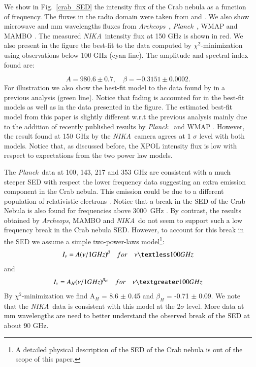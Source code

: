 \documentclass[twocolumn,traditabstract]{aa}
\def\NIKA{\textit{NIKA}}
\def\Archeops{\textit{Archeops}}
\def\Planck{\textit{Planck}}
\begin{document}
We show in Fig.~\ref{crab_SED} the intensity flux of the Crab nebula as a function of frequency. The fluxes in the radio domain were taken from \cite{dmitrenko1970absolute} and \cite{1971IzVUZ..14..157V}. We also show microwave and mm wavelengths fluxes from \Archeops\ \citep{macias2007archeops}, \Planck\ \citep{2015arXiv150702058P}, WMAP \citep{2011ApJS..192...19W} and MAMBO \citep{2002A&A...386.1044B}. The measured \NIKA\ intensity flux at 150 GHz is shown in red.
We also present in the figure the best-fit to the data computed by $\chi^2$-minimization using observations below 100 GHz (cyan line). The amplitude and spectral index found are: 

\begin{equation}
 A = 980.6 \pm 0.7  ,\quad \beta = -0.3151 \pm 0.0002. 
 \end{equation}
 For illustration we also show the best-fit model to the data found by \cite{macias2010} in a previous analysis (green line). 
Notice that fading is accounted for in the best-fit models as well as in the data presented in the figure.
The estimated best-fit model from this paper is slightly different w.r.t the previous analysis mainly due to the addition of recently published results by \Planck\ \citep{2015arXiv150702058P} and  WMAP \citep{2011ApJS..192...19W}. However, the result found at 150 GHz by the \NIKA\ camera agrees at 1 $\sigma$ level with both models. 
Notice that, as discussed before, the XPOL intensity flux is low with respect to expectations from the two power law models. 
 
The \Planck\ data at 100, 143, 217 and 353 GHz are consistent with a much
steeper SED with respect the lower frequency data suggesting an extra emission
component in the Crab nebula. This emission could be due to a different
population of relativistic electrons \citep{1965ARA&A...3..297G}. Notice that a
break in the SED of the Crab Nebula is also found for frequencies above 3000~GHz
\citep{macias2010}.  By contrast, the results obtained by {\it Archeops}, MAMBO
and \NIKA\ do not seem to support such a low frequency break in the Crab nebula
SED. However, to account for this break in the SED we assume a simple
two-power-laws model\footnote{A detailed physical description of the SED of the
  Crab nebula is out of the scope of this paper.}:
\begin{equation}
I_{\nu} = A(\nu/1GHz)^{\beta} \quad for \quad \nu   \textless  100 GHz
\end{equation}
and 
\begin{equation}
I_{\nu} = A_{H}(\nu/1GHz)^{\beta_H} \quad for \quad \nu   \textgreater  100 GHz
\end{equation}
By $\chi^2$-minimization we find
A$_H$ = 8.6 $\pm$ 0.45 and $\beta_H$ = -0.71 $\pm$ 0.09.
We note that the \NIKA\ data is consistent with this model at the 2$\sigma$ level. More data at mm wavelengths are need to better understand the observed break of the SED at about 90 GHz. 
\end{document}
